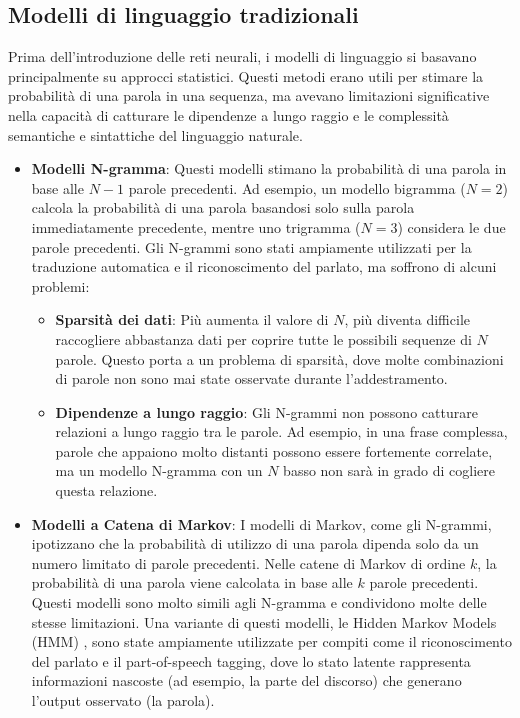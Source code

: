 \subsection{Modelli di linguaggio tradizionali}
Prima dell'introduzione delle reti neurali, i modelli di linguaggio si basavano principalmente su approcci statistici. Questi metodi erano utili per stimare la probabilità di una parola in una sequenza, ma avevano limitazioni significative nella capacità di catturare le dipendenze a lungo raggio e le complessità semantiche e sintattiche del linguaggio naturale.
\begin{itemize}
	\item \textbf{Modelli N-gramma}: Questi modelli stimano la probabilità di una parola in base alle \(N - 1\) parole precedenti. Ad esempio, un modello bigramma (\(N = 2\)) calcola la probabilità di una parola basandosi solo sulla parola immediatamente precedente, mentre uno trigramma (\(N = 3\)) considera le due parole precedenti. Gli N-grammi sono stati ampiamente utilizzati per la traduzione automatica e il riconoscimento del parlato, ma soffrono di alcuni problemi:
	\begin{itemize}
		\item \textbf{Sparsità dei dati}: Più aumenta il valore di \(N\), più diventa difficile raccogliere abbastanza dati per coprire tutte le possibili sequenze di \(N\) parole. Questo porta a un problema di sparsità, dove molte combinazioni di parole non sono mai state osservate durante l'addestramento.
		\item \textbf{Dipendenze a lungo raggio}: Gli N-grammi non possono catturare relazioni a lungo raggio tra le parole. Ad esempio, in una frase complessa, parole che appaiono molto distanti possono essere fortemente correlate, ma un modello N-gramma con un \(N\) basso non sarà in grado di cogliere questa relazione.
	\end{itemize}
	\item \textbf{Modelli a Catena di Markov}: I modelli di Markov, come gli N-grammi, ipotizzano che la probabilità di utilizzo di una parola dipenda solo da un numero limitato di parole precedenti. Nelle catene di Markov di ordine \(k\), la probabilità di una parola viene calcolata in base alle \(k\) parole precedenti. Questi modelli sono molto simili agli N-gramma e condividono molte delle stesse limitazioni. Una variante di questi modelli, le Hidden Markov Models (HMM) \cite{stolcke1994bestfirstmodelmerginghidden}, sono state ampiamente utilizzate per compiti come il riconoscimento del parlato e il part-of-speech tagging, dove lo stato latente rappresenta informazioni nascoste (ad esempio, la parte del discorso) che generano l'output osservato (la parola).

\end{itemize}
